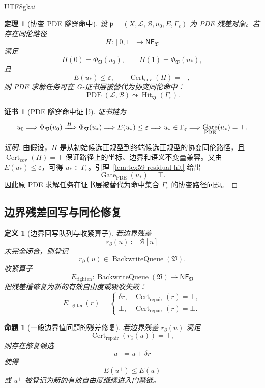 \documentclass[12pt]{article}
\newtheorem{definition}{定义}[section]
\newtheorem{theorem}{定理}[section]
\newtheorem{proposition}{命题}[section]
\newtheorem{Certificate}{证书}[section]
\newcommand{\Vsys}{\mathfrak V}
\newcommand{\NF}{\mathsf{NF}}
\newcommand{\DefEq}{\coloneqq}
\newcommand{\Lcal}{\mathcal{L}}
\newcommand{\Bcal}{\mathcal{B}}
\newcommand{\eps}{\varepsilon}
\DeclareMathOperator{\Cert}{Cert}
\DeclareMathOperator{\Gate}{Gate}
\DeclareMathOperator{\Hit}{Hit}
\DeclareMathOperator{\BackwriteQueue}{BackwriteQueue}
\DeclareMathOperator{\PDE}{PDE}
\begin{document}
\begin{CJK*}{UTF8}{gkai}
\begin{theorem}[协变 PDE 隧穿命中]
\label{thm:tex59-pde-tunnel}
设 \(\mathfrak p=(X,\Lcal,\Bcal,u_0,E,\Gamma_{\eps})\) 为 PDE 残差对象。若存在同伦路径
\[
  H:[0,1]\longrightarrow \NF_{\Vsys}
\]
满足
\[
  H(0)=\Phi_{\Vsys}(u_0),\qquad
  H(1)=\Phi_{\Vsys}(u_{\ast}),
\]
且
\[
  E(u_{\ast})\le\eps,\qquad
  \Cert_{\mathrm{cov}}(H)=\top,
\]
则 PDE 求解任务可在 G-证书层被替代为协变同伦命中：
\[
  \PDE(\Lcal,\Bcal)
  \leadsto
  \Hit_{\Vsys}(\Gamma_{\eps}).
\]
\end{theorem}

\begin{Certificate}[PDE 隧穿命中证书]
\label{cert:tex59-pde-tunnel}
证书链为
\[
  u_0
  \Longrightarrow
  \Phi_{\Vsys}(u_0)
  \xRightarrow{\,H\,}
  \Phi_{\Vsys}(u_{\ast})
  \Longrightarrow
  E(u_{\ast})\le\eps
  \Longrightarrow
  u_{\ast}\in\Gamma_{\eps}
  \Longrightarrow
  \Gate_{\PDE}(u_{\ast})=\top.
\]
\end{Certificate}

\begin{proof}[证明]
由假设，\(H\) 是从初始候选正规型到终端候选正规型的协变同伦路径，且
\(\Cert_{\mathrm{cov}}(H)=\top\) 保证路径上的坐标、边界和语义不变量兼容。又由
\(E(u_{\ast})\le\eps\)，可得 \(u_{\ast}\in\Gamma_{\eps}\)。引理~\ref{lem:tex59-residual-hit}
给出
\[
  \Gate_{\PDE}(u_{\ast})=\top.
\]
因此原 PDE 求解任务在证书层被替代为命中集合 \(\Gamma_{\eps}\) 的协变路径问题。
\end{proof}

\subsection{边界残差回写与同伦修复}
\label{subsec:tex59-boundary-repair}

\begin{definition}[边界回写队列与收紧算子]
\label{def:tex59-backwrite-tighten}
若边界残差
\[
  r_{\partial}(u)\DefEq \Bcal[u]
\]
未完全闭合，则登记
\[
  r_{\partial}(u)\in \BackwriteQueue(\Vsys).
\]
收紧算子
\[
  E_{\mathrm{tighten}}:\BackwriteQueue(\Vsys)\longrightarrow \NF_{\Vsys}
\]
把残差槽修复为新的有效自由度或吸收失败：
\[
  E_{\mathrm{tighten}}(r)=
  \begin{cases}
  \delta r, & \Cert_{\mathrm{repair}}(r)=\top,\\
  \bot, & \Cert_{\mathrm{repair}}(r)=\bot.
  \end{cases}
\]
\end{definition}

\begin{proposition}[一般边界值问题的残差修复]
\label{prop:tex59-bvp-repair}
若边界残差 \(r_{\partial}(u)\) 满足
\[
  \Cert_{\mathrm{repair}}(r_{\partial}(u))=\top,
\]
则存在修复候选
\[
  u^+=u+\delta r
\]
使得
\[
  E(u^+)\le E(u)
\]
或 \(u^+\) 被登记为新的有效自由度继续进入门禁链。
\end{proposition}


\end{CJK*}
\end{document}
